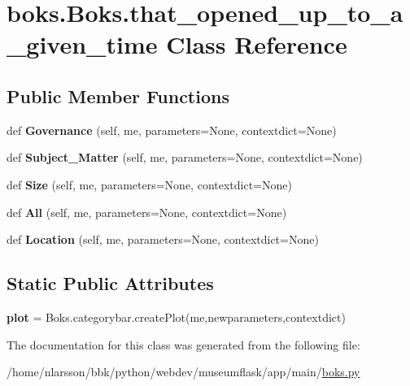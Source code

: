 \hypertarget{classboks_1_1Boks_1_1that__opened__up__to__a__given__time}{}\section{boks.\+Boks.\+that\+\_\+opened\+\_\+up\+\_\+to\+\_\+a\+\_\+given\+\_\+time Class Reference}
\label{classboks_1_1Boks_1_1that__opened__up__to__a__given__time}
\subsection*{Public Member Functions}
\begin{DoxyCompactItemize}
\item 
\mbox{\label{classboks_1_1Boks_1_1that__opened__up__to__a__given__time_ae0dfa626dbcae609ce9f003ff8f404f7}} 
def {\bfseries Governance} (self, me, parameters=None, contextdict=None)
\item 
\mbox{\label{classboks_1_1Boks_1_1that__opened__up__to__a__given__time_af744cbad66f9af71c6fceef160da855b}} 
def {\bfseries Subject\+\_\+\+Matter} (self, me, parameters=None, contextdict=None)
\item 
\mbox{\label{classboks_1_1Boks_1_1that__opened__up__to__a__given__time_acd8ca07b3923e7575bdb8c34dc1733a5}} 
def {\bfseries Size} (self, me, parameters=None, contextdict=None)
\item 
\mbox{\label{classboks_1_1Boks_1_1that__opened__up__to__a__given__time_a47358a4d7ac274c3086707ce07e44787}} 
def {\bfseries All} (self, me, parameters=None, contextdict=None)
\item 
\mbox{\label{classboks_1_1Boks_1_1that__opened__up__to__a__given__time_a80d74a1061103120f370e8b717342854}} 
def {\bfseries Location} (self, me, parameters=None, contextdict=None)
\end{DoxyCompactItemize}
\subsection*{Static Public Attributes}
\begin{DoxyCompactItemize}
\item 
\mbox{\label{classboks_1_1Boks_1_1that__opened__up__to__a__given__time_a01c482b63720e8faf455df0e6b56c457}} 
{\bfseries plot} = Boks.\+categorybar.\+create\+Plot(me,newparameters,contextdict)
\end{DoxyCompactItemize}


The documentation for this class was generated from the following file\+:\begin{DoxyCompactItemize}
\item 
/home/nlarsson/bbk/python/webdev/museumflask/app/main/\mbox{\hyperlink{boks_8py}{boks.\+py}}\end{DoxyCompactItemize}
